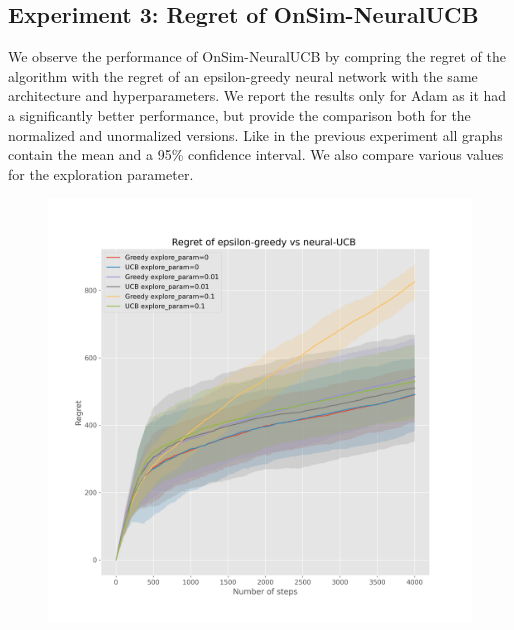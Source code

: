 \documentclass{article}
\begin{document}
\subsection{Experiment 3: Regret of OnSim-NeuralUCB}
We observe the performance of OnSim-NeuralUCB by compring the regret of the algorithm with the regret of an epsilon-greedy
neural network with the same architecture and hyperparameters. We report the results only for Adam as it had a significantly better performance,
but provide the comparison both for the normalized and unormalized versions.
Like in the previous experiment all graphs contain the mean and a 95\% confidence interval. We also compare various values for
the exploration parameter.

\begin{figure}[!h]
  \centering
  \begin{minipage}{.45\textwidth}
    \centering
    \includegraphics[width=\linewidth]{online-epsilon-vs-neural-reduced-nonormalized-ci}
  \end{minipage}%
  \begin{minipage}{.45\textwidth}
    \centering

\end{minipage}
\end{figure}
\end{document}
